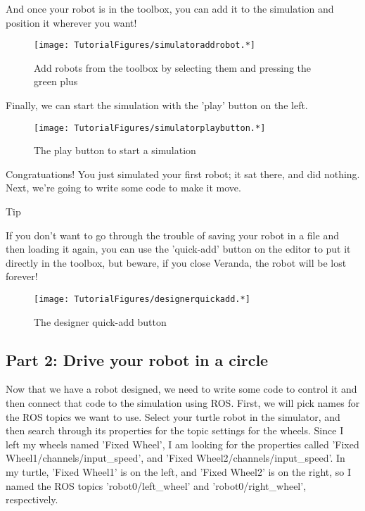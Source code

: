 And once your robot is in the toolbox, you can add it to the simulation
and position it wherever you want!

\begin{figure}
\centering
\texttt{[image: TutorialFigures/simulatoraddrobot.*]}
\caption{Add robots from the toolbox by selecting them and pressing the
green plus}
\end{figure}

Finally, we can start the simulation with the 'play' button on the left.

\begin{figure}
\centering
\texttt{[image: TutorialFigures/simulatorplaybutton.*]}
\caption{The play button to start a simulation}
\end{figure}

Congratuations! You just simulated your first robot; it sat there, and
did nothing. Next, we're going to write some code to make it move.

Tip

If you don't want to go through the trouble of saving your robot in a
file and then loading it again, you can use the 'quick-add' button on
the editor to put it directly in the toolbox, but beware, if you close
Veranda, the robot will be lost forever!

\begin{figure}
\centering
\texttt{[image: TutorialFigures/designerquickadd.*]}
\caption{The designer quick-add button}
\end{figure}

\hypertarget{part-2-drive-your-robot-in-a-circle}{%
\subsection{Part 2: Drive your robot in a
circle}\label{part-2-drive-your-robot-in-a-circle}}

Now that we have a robot designed, we need to write some code to control
it and then connect that code to the simulation using ROS. First, we
will pick names for the ROS topics we want to use. Select your turtle
robot in the simulator, and then search through its properties for the
topic settings for the wheels. Since I left my wheels named 'Fixed
Wheel', I am looking for the properties called 'Fixed
Wheel1/channels/input\_speed', and 'Fixed Wheel2/channels/input\_speed'.
In my turtle, 'Fixed Wheel1' is on the left, and 'Fixed Wheel2' is on
the right, so I named the ROS topics 'robot0/left\_wheel' and
'robot0/right\_wheel', respectively.

